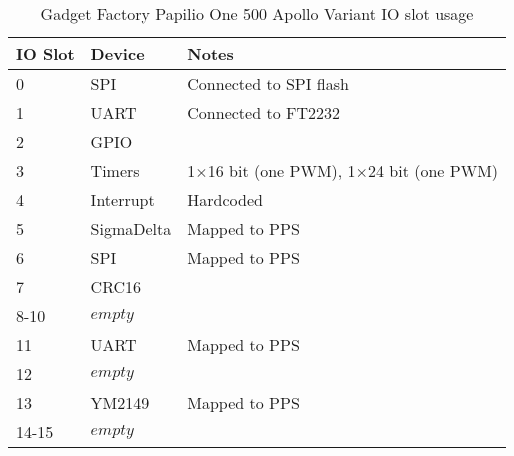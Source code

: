 \documentclass[12pt,a4paper,openany,smallheadings,headinclude,headsepline,final]{scrreprt}
\def \board {Gadget Factory Papilio One 500 Apollo Variant }
\begin{document}
\begin{table}[H]
\begin{center}
\begin{tabularx}{14cm}{llX}
IO Slot & Device & Notes \\
\hline
0 & SPI         & Connected to SPI flash \\
1 & UART	& Connected to FT2232 \\
2 & GPIO 	& \\
3 & Timers 	& 1$\times$16 bit (one PWM), 1$\times$24 bit (one PWM) \\
4 & Interrupt 	& Hardcoded \\
5 & SigmaDelta 	& Mapped to PPS \\
6 & SPI 	& Mapped to PPS \\
7 & CRC16 	& \\
8-10 & $empty$ 	& \\
11 & UART 	& Mapped to PPS \\
12 & $empty$    & \\
13 & YM2149     & Mapped to PPS \\
14-15 & $empty$ & 
\end{tabularx}
\caption{\board IO slot usage}
\end{center}
\end{table}
\end{document}
